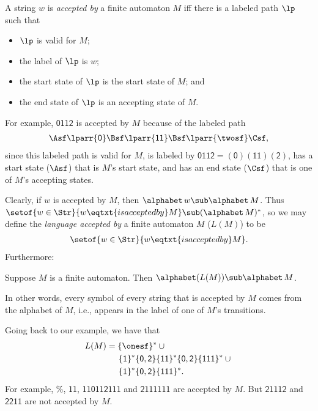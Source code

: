 A string $w$ is \emph{accepted by} a finite automaton $M$ iff
there is a labeled path $\lp$ such that
\begin{itemize}
\item $\lp$ is valid for $M$;

\item the label of $\lp$ is $w$;

\item the start state of $\lp$ is the start state of $M$; and

\item the end state of $\lp$ is an accepting state of $M$.
\end{itemize}
For example, $\mathsf{0112}$ is accepted by
$M$ because of the labeled path
\begin{gather*}
\Asf\lparr{\mathsf{0}}\Bsf\lparr{\mathsf{11}}\Bsf\lparr{\twosf}\Csf ,
\end{gather*}
since this labeled path is valid for $M$, is labeled by $\mathsf{0112} =
\mathsf{(0)(11)(2)}$, has a start state ($\Asf$) that is $M$'s start state,
and has an end state ($\Csf$) that is one of $M$'s accepting states.

Clearly, if $w$ is accepted by $M$, then
$\alphabet\,w\sub\alphabet\,M$.  Thus $\setof{w\in\Str}{w\eqtxt{is
    accepted by}M}\sub(\alphabet\,M)^*$, so we may define the
\emph{language accepted by} a finite automaton $M$ ($L(M)$) to be
\begin{gather*}
\setof{w\in\Str}{w\eqtxt{is accepted by}M}.
\end{gather*}
Furthermore:

\begin{proposition}
Suppose $M$ is a finite automaton.  Then $\alphabet(L(M))\sub\alphabet\,M$.
\end{proposition}

In other words, every symbol of every string that is accepted by $M$
comes from the alphabet of $M$, i.e., appears in the label of one of
$M$'s transitions.

Going back to our example, we have that
\begin{align*}
L(M) &= \{\onesf\}^* \cup {}\\
     &\quad\;\,\mathsf{\{1\}^*\{0,2\}\{11\}^*\{0,2\}\{111\}^*} \cup {} \\
     &\quad\;\,\mathsf{\{1\}^*\{0,2\}\{111\}^*} .
\end{align*}
For example, $\%$, $\mathsf{11}$, $\mathsf{110112111}$ and
$\mathsf{2111111}$ are accepted by $M$.  But $\mathsf{21112}$ and
$\mathsf{2211}$ are not accepted by $M$.

